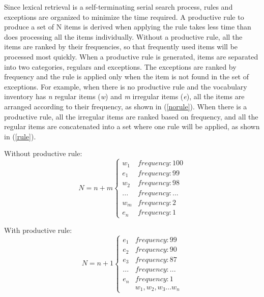 Since lexical retrieval is a self-terminating serial search process, rules and exceptions are organized to minimize the time required. A productive rule to produce a set of N items is derived when applying the rule takes less time than does processing all the items individually. Without a productive rule, all the items are ranked by their frequencies, so that frequently used items will be processed most quickly. When a productive rule is generated, items are separated into two categories, regulars and exceptions. The exceptions are ranked by frequency and the rule is applied only when the item is not found in the set of exceptions. For example, when there is no productive rule and the vocabulary inventory has \textit{n} regular items (\textit{w}) and \textit{m} irregular items (\textit{e}), all the items are arranged according to their frequency, as shown in (\ref{norule}). When there is a productive rule, all the irregular items are ranked based on frequency, and all the regular items are concatenated into a set where one rule will be applied, as shown in (\ref{rule}). 
\begin{exe}
\begin{minipage}{0.5\linewidth}
\ex Without productive rule:
\begin{equation*}
N = n+m \left\{\begin{array}{cc} 
 w_1 & frequency: 100 \\
 e_1 & frequency: 99\\
 w_2 & frequency: 98\\
 ... & frequency: ...\\
w_m & frequency: 2\\
e_n & frequency: 1
\end{array}
\right. \label{norule}
\end{equation*}
\end{minipage}
\begin{minipage}{0.5\linewidth}
\ex With productive rule:
\begin{equation*}
N = n+1 \left\{\begin{array}{cc} 
 e_1 & frequency: 99 \\
 e_2 & frequency: 90 \\
 e_3 & frequency: 87 \\
 ... & frequency: ...\\
 e_n & frequency: 1\\
 & {w_1,w_2,w_3...w_n} 
\end{array}
\right. \label{rule}
\end{equation*}
\end{minipage}
\end{exe}
